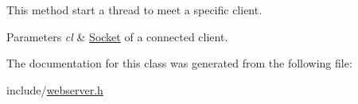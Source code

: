 This method start a thread to meet a specific client. 


\begin{DoxyParams}{Parameters}
{\em cl} & \hyperlink{classSocket}{Socket} of a connected client. \\
\hline
\end{DoxyParams}


The documentation for this class was generated from the following file\+:\begin{DoxyCompactItemize}
\item 
include/\hyperlink{webserver_8h}{webserver.\+h}\end{DoxyCompactItemize}
